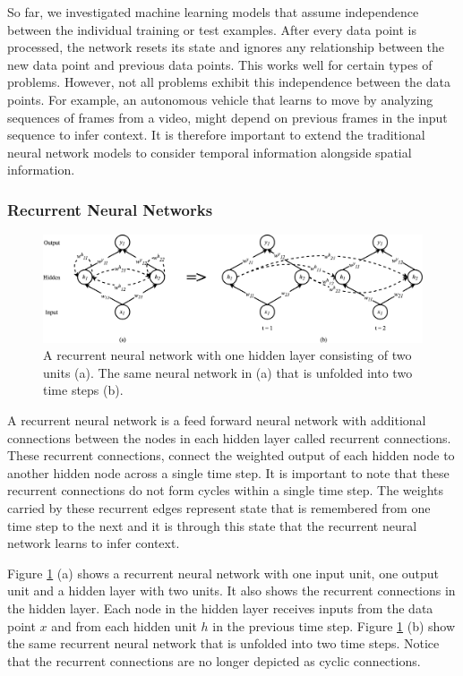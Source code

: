 \documentclass{article}
\begin{document}
	So far, we investigated machine learning models that assume independence between the individual training or test examples. After every data point is processed, the network resets its state and ignores any relationship between the new data point and previous data points. This works well for certain types of problems. However, not all problems exhibit this independence between the data points. For example, an autonomous vehicle that learns to move by analyzing sequences of frames from a video, might depend on previous frames in the input sequence to infer context. It is therefore important to extend the traditional neural network models to consider temporal information alongside spatial information\cite{DBLP:journals/corr/Lipton15}.
	
	\subsubsection{Recurrent Neural Networks}
	
	\begin{figure}
		\centering
		\includegraphics[max width=\textwidth]{recurrent-neural-network}
		\caption{A recurrent neural network with one hidden layer consisting of two units (a). The same neural network in (a) that is unfolded into two time steps (b).}
		\label{fig:recurrent-neural-network}
	\end{figure}
	
	A recurrent neural network is a feed forward neural network with additional connections between the nodes in each hidden layer called recurrent connections. These recurrent connections, connect the weighted output of each hidden node to another hidden node across a single time step. It is important to note that these recurrent connections do not form cycles within a single time step. The weights carried by these recurrent edges represent state that is remembered from one time step to the next and it is through this state that the recurrent neural network learns to infer context\cite{DBLP:journals/corr/Lipton15}.
	
	Figure \ref{fig:recurrent-neural-network} (a) shows a recurrent neural network with one input unit, one output unit and a hidden layer with two units. It also shows the recurrent connections in the hidden layer. Each node in the hidden layer receives inputs from the data point $x$ and from each hidden unit $h$ in the previous time step. Figure \ref{fig:recurrent-neural-network} (b) show the same recurrent neural network that is unfolded into two time steps. Notice that the recurrent connections are no longer depicted as cyclic connections.
	
\end{document}
